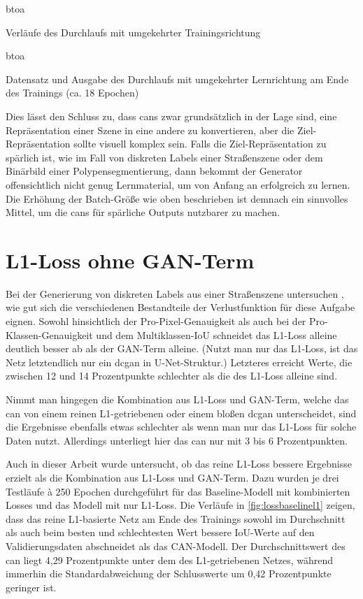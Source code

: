 \begin{losseswoiou}{btoa}
	\caption{Verläufe des Durchlaufs mit umgekehrter Trainingsrichtung}
	\label{fig:lossbtoa}
\end{losseswoiou}

\begin{outputs}{btoa}
	\caption[Datensatz und Ausgabe des Durchlaufs mit umgekehrter Lernrichtung am Ende des Trainings]{Datensatz und Ausgabe des Durchlaufs mit umgekehrter Lernrichtung am Ende des Trainings (ca. 18 Epochen)}
	\label{fig:outputsbtoa}
\end{outputs}

Dies lässt den Schluss zu, dass \glspl{can} zwar grundsätzlich in der Lage sind, eine Repräsentation einer Szene in eine andere zu konvertieren, aber die Ziel-Repräsentation sollte visuell komplex sein.
Falls die Ziel-Repräsentation zu spärlich ist, wie im Fall von diskreten Labels einer Straßenszene oder dem Binärbild einer Polypensegmentierung, dann bekommt der Generator offensichtlich nicht genug Lernmaterial, um von Anfang an erfolgreich zu lernen.
Die Erhöhung der Batch-Größe wie oben beschrieben ist demnach ein sinnvolles Mittel, um die \glspl{can} für spärliche Outputs nutzbarer zu machen.



\section{L1-Loss ohne GAN-Term}

Bei der Generierung von diskreten Labels aus einer Straßenszene untersuchen \citeauthor{Isola.2017}, wie gut sich die verschiedenen Bestandteile der Verlustfunktion für diese Aufgabe eignen.
Sowohl hinsichtlich der Pro-Pixel-Genauigkeit als auch bei der Pro-Klassen-Genauigkeit und dem Multiklassen-IoU schneidet das L1-Loss alleine deutlich besser ab als der GAN-Term alleine.
(Nutzt man nur das L1-Loss, ist das Netz letztendlich nur ein \gls{dcgan} in U-Net-Struktur.)
Letzteres erreicht Werte, die zwischen 12 und 14 Prozentpunkte schlechter als die des L1-Loss alleine sind.

Nimmt man hingegen die Kombination aus L1-Loss und GAN-Term, welche das \gls{can} von einem reinen L1-getriebenen oder einem bloßen \gls{dcgan} unterscheidet, sind die Ergebnisse ebenfalls etwas schlechter als wenn man nur das L1-Loss für solche Daten nutzt.
Allerdings unterliegt hier das \gls{can} nur mit 3 bis 6 Prozentpunkten.

Auch in dieser Arbeit wurde untersucht, ob das reine L1-Loss bessere Ergebnisse erzielt als die Kombination aus L1-Loss und GAN-Term.
Dazu wurden je drei Testläufe à 250 Epochen durchgeführt für das Baseline-Modell mit kombinierten Losses und das Modell mit nur L1-Loss.
Die Verläufe in \autoref{fig:lossbaselinel1} zeigen, dass das reine L1-basierte Netz am Ende des Trainings sowohl im Durchschnitt als auch beim besten und schlechtesten Wert bessere IoU-Werte auf den Validierungsdaten abschneidet als das CAN-Modell.
Der Durchschnittswert des \gls{can} liegt 4,29 Prozentpunkte unter dem des L1-getriebenen Netzes, während immerhin die Standardabweichung der Schlusswerte um 0,42 Prozentpunkte geringer ist.

